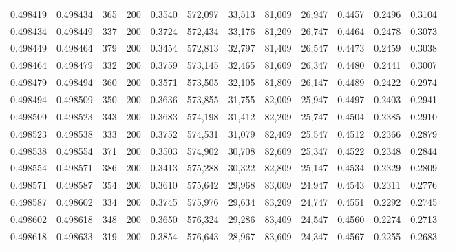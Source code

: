 \begin{tabular}{rrrrrrrrrrrrr}
0.498419 & 0.498434 &    365 & 200 &                                     0.3540 & 572,097 &  33,513 &  81,009 &  26,947 & 0.4457 & 0.2496 & 0.3104 \\
0.498434 & 0.498449 &    337 & 200 &                                     0.3724 & 572,434 &  33,176 &  81,209 &  26,747 & 0.4464 & 0.2478 & 0.3073 \\
0.498449 & 0.498464 &    379 & 200 &                                     0.3454 & 572,813 &  32,797 &  81,409 &  26,547 & 0.4473 & 0.2459 & 0.3038 \\
0.498464 & 0.498479 &    332 & 200 &                                     0.3759 & 573,145 &  32,465 &  81,609 &  26,347 & 0.4480 & 0.2441 & 0.3007 \\
0.498479 & 0.498494 &    360 & 200 &                                     0.3571 & 573,505 &  32,105 &  81,809 &  26,147 & 0.4489 & 0.2422 & 0.2974 \\
0.498494 & 0.498509 &    350 & 200 &                                     0.3636 & 573,855 &  31,755 &  82,009 &  25,947 & 0.4497 & 0.2403 & 0.2941 \\
0.498509 & 0.498523 &    343 & 200 &                                     0.3683 & 574,198 &  31,412 &  82,209 &  25,747 & 0.4504 & 0.2385 & 0.2910 \\
0.498523 & 0.498538 &    333 & 200 &                                     0.3752 & 574,531 &  31,079 &  82,409 &  25,547 & 0.4512 & 0.2366 & 0.2879 \\
0.498538 & 0.498554 &    371 & 200 &                                     0.3503 & 574,902 &  30,708 &  82,609 &  25,347 & 0.4522 & 0.2348 & 0.2844 \\
0.498554 & 0.498571 &    386 & 200 &                                     0.3413 & 575,288 &  30,322 &  82,809 &  25,147 & 0.4534 & 0.2329 & 0.2809 \\
0.498571 & 0.498587 &    354 & 200 &                                     0.3610 & 575,642 &  29,968 &  83,009 &  24,947 & 0.4543 & 0.2311 & 0.2776 \\
0.498587 & 0.498602 &    334 & 200 &                                     0.3745 & 575,976 &  29,634 &  83,209 &  24,747 & 0.4551 & 0.2292 & 0.2745 \\
0.498602 & 0.498618 &    348 & 200 &                                     0.3650 & 576,324 &  29,286 &  83,409 &  24,547 & 0.4560 & 0.2274 & 0.2713 \\
0.498618 & 0.498633 &    319 & 200 &                                     0.3854 & 576,643 &  28,967 &  83,609 &  24,347 & 0.4567 & 0.2255 & 0.2683 \\

\end{tabular}
